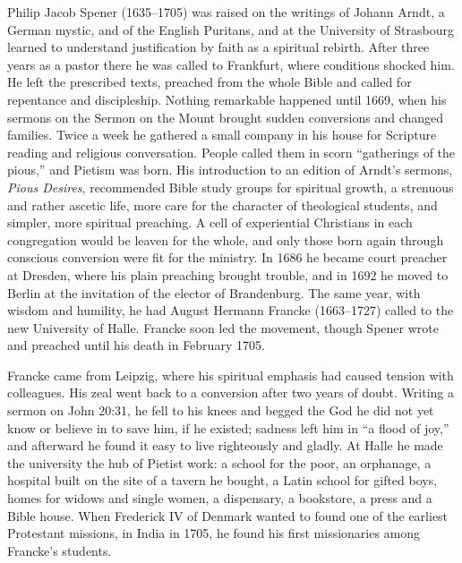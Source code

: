 Philip Jacob Spener (1635--1705) was raised on the writings of Johann Arndt, a German mystic, and of the English Puritans,
and at the University of Strasbourg learned to understand justification by faith as a spiritual
rebirth. After three years as a pastor there he was called to Frankfurt, where conditions shocked
him. He left the prescribed texts, preached from the whole Bible and called for repentance and
discipleship. Nothing remarkable happened until 1669, when his sermons on the Sermon on the Mount
brought sudden conversions and changed families. Twice a week he gathered a small company in his
house for Scripture reading and religious conversation. People called them in scorn ``gatherings of
the pious,'' and Pietism was born. His introduction to an edition of Arndt's sermons, \emph{Pious
Desires}, recommended Bible study groups for spiritual growth, a strenuous and rather ascetic life,
more care for the character of theological students, and simpler, more spiritual preaching. A cell of
experiential Christians in each congregation would be leaven for the whole, and only those born again
through conscious conversion were fit for the ministry. In 1686 he became court preacher at Dresden,
where his plain preaching brought trouble, and in 1692 he moved to Berlin at the invitation of the
elector of Brandenburg. The same year, with wisdom and humility, he had August Hermann Francke
(1663--1727) called to the new University of Halle. Francke soon led the movement, though Spener wrote
and preached until his death in February 1705.

Francke came from Leipzig, where his spiritual emphasis had caused tension with colleagues. His zeal
went back to a conversion after two years of doubt. Writing a sermon on John 20:31, he fell to his
knees and begged the God he did not yet know or believe in to save him, if he existed; sadness left
him in ``a flood of joy,'' and afterward he found it easy to live righteously and gladly. At Halle
he made the university the hub of Pietist work: a school for the poor, an orphanage, a hospital built
on the site of a tavern he bought, a Latin school for gifted boys, homes for widows and single women, a dispensary, a bookstore, a press and a Bible house. When Frederick IV of
Denmark wanted to found one of the earliest Protestant missions, in India in 1705, he found his first
missionaries among Francke's students.

